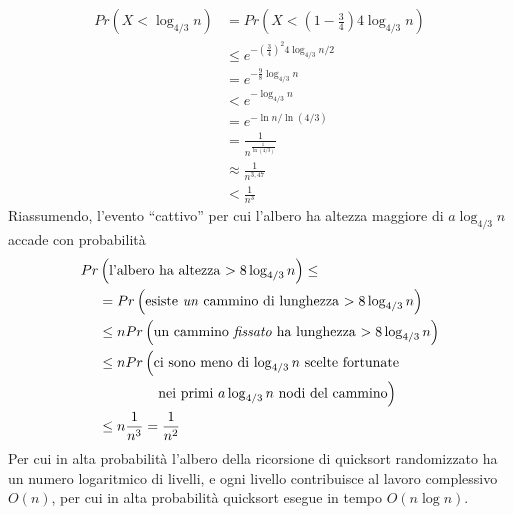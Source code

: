 \begin{align*}
    Pr \left( 
        X < \log_{4/3} n
    \right)
    &= 
    Pr \left( 
        X
        <
        \left( 1 - \frac{3}{4} \right) 4
        \log_{4/3} n
    \right)
    \\
    &
    \leq
    e^{
        - \left( 
            \frac{3}{4}
        \right)^{2}
        4
        \log_{4/3} n
        \big/ 2
    }
    \\
    &= 
    e^{
        - \frac{9}{8}
        \log_{4/3} n
    }
    \\
    &
    <
    e^{
        - \log_{4/3} n
    }
    \\
    &= 
    e^{
        - \ln n / \ln (4/3)
    }
    \\
    &= 
    \frac{1}{
        n^{
            \frac{
                1
            }{
                \ln (4/3)
            }
        }
    }
    \\
    &
    \approx
    \frac{1}{
        n^{
            3,47
        }
    }
    \\
    &
    <
    \frac{1}{n^3}
\end{align*}
Riassumendo, l'evento ``cattivo'' per cui l'albero ha altezza maggiore di $a \log_{4/3} n$ accade con probabilità
\begin{align*}
    Pr
    &
    \left( 
        \text{l'albero ha altezza $> 8 \log_{4/3} n$}
    \right)
    \leq
    \\
    &
    =
    Pr \left( 
        \text{esiste \emph{un} cammino di lunghezza $> 8 \log_{4/3} n$}
    \right)
    \\
    &
    \leq
    n
    Pr \left( 
        \text{un cammino \emph{fissato} ha lunghezza $> 8 \log_{4/3} n$}
    \right)
    \\
    &
    \leq
    n
    Pr
    \left( 
        \text{ci sono meno di $\log_{4/3} n$ scelte fortunate}
    \right.
    \\
    &
    \quad
    \quad
    \quad
    \quad
    \left.
        \text{nei primi $a \log_{4/3} n$ nodi del cammino}
    \right)
    \\
    &
    \leq
    n
    \frac{1}{n^3}
    =
    \frac{1}{n^2}
\end{align*}
Per cui in alta probabilità l'albero della ricorsione di quicksort randomizzato ha un numero logaritmico di livelli,
e ogni livello contribuisce al lavoro complessivo $
O (n)
$, per cui in alta probabilità quicksort esegue in tempo $
O (n \log n)
$.


